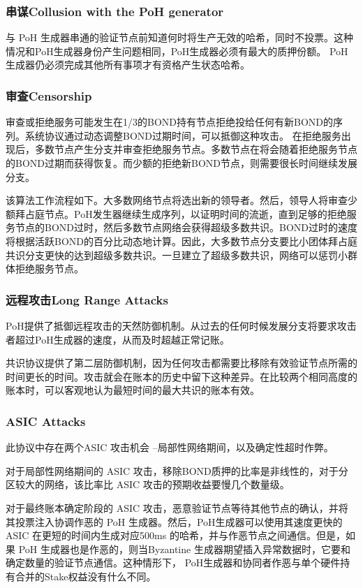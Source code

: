 \documentclass[12pt, uft8]{ctexart}
\begin{document}
\subsubsection{串谋Collusion with the PoH generator}\label{subsubsec:collusion}
与 PoH 生成器串通的验证节点前知道何时将生产无效的哈希，同时不投票。这种情况和PoH生成器身份产生问题相同，PoH生成器必须有最大的质押份额。 PoH生成器仍必须完成其他所有事项才有资格产生状态哈希。

\subsubsection{审查Censorship}\label{censorship}
审查或拒绝服务可能发生在1/3的BOND持有节点拒绝投给任何有新BOND的序列。系统协议通过动态调整BOND过期时间，可以抵御这种攻击。 在拒绝服务出现后，多数节点产生分支并审查拒绝服务节点。多数节点在将会随着拒绝服务节点的BOND过期而获得恢复。而少额的拒绝新BOND节点，则需要很长时间继续发展分支。

该算法工作流程如下。大多数网络节点将选出新的领导者。然后，领导人将审查少额拜占庭节点。PoH发生器继续生成序列，以证明时间的流逝，直到足够的拒绝服务节点的BOND过时，然后多数节点网络会获得超级多数共识。BOND过时的速度将根据活跃BOND的百分比动态地计算。因此，大多数节点分支要比小团体拜占庭共识分支更快的达到超级多数共识。一旦建立了超级多数共识，网络可以惩罚小群体拒绝服务节点。

\subsubsection{远程攻击Long Range Attacks}\label{censorship}
PoH提供了抵御远程攻击的天然防御机制。从过去的任何时候发展分支将要求攻击者超过PoH生成器的速度，从而及时超越正常记账。

共识协议提供了第二层防御机制，因为任何攻击都需要比移除有效验证节点所需的时间更长的时间。攻击就会在账本的历史中留下这种差异。在比较两个相同高度的账本时，可以客观地认为最短时间的最大共识的账本有效。

\subsubsection{ASIC Attacks}\label{censorship}

此协议中存在两个ASIC 攻击机会 –局部性网络期间，以及确定性超时作弊。

对于局部性网络期间的 ASIC 攻击，移除BOND质押的比率是非线性的，对于分区较大的网络，该比率比 ASIC 攻击的预期收益要慢几个数量级。

对于最终账本确定阶段的 ASIC 攻击，恶意验证节点等待其他节点的确认，并将其投票注入协调作恶的 PoH 生成器。然后，PoH生成器可以使用其速度更快的 ASIC 在更短的时间内生成对应500ms 的哈希，并与作恶节点之间通信。但是，如果 PoH 生成器也是作恶的，则当Byzantine 生成器期望插入异常数据时，它要和确定数量的验证节点通信。这种情形下， PoH生成器和协同者作恶与单个硬件持有合并的Stake权益没有什么不同。
\end{document}

